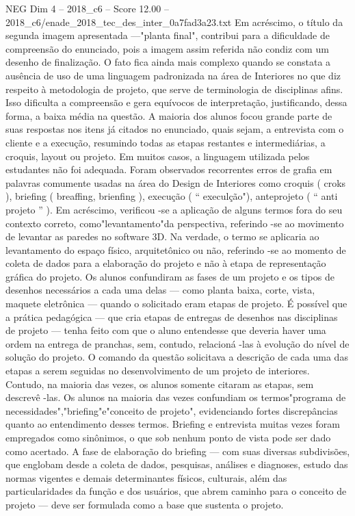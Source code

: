 \begin{textsample}{NEG Dim 4 – 2018\_c6 – Score 12.00 – 2018\_c6/enade\_2018\_tec\_des\_inter\_0a7fad3a23.txt}
Em acréscimo, o título da segunda imagem apresentada —"planta final", contribui para a dificuldade de compreensão do enunciado, pois a imagem assim referida não condiz com um desenho de finalização.
O fato fica ainda mais complexo quando se constata a ausência de uso de uma linguagem padronizada na área de Interiores no que diz respeito à metodologia de projeto, que serve de terminologia de disciplinas afins.
Isso dificulta a compreensão e gera equívocos de interpretação, justificando, dessa forma, a baixa média na questão.
A maioria dos alunos focou grande parte de suas respostas nos itens já citados no enunciado, quais sejam, a entrevista com o cliente e a execução, resumindo todas as etapas restantes e intermediárias, a croquis, layout ou projeto.
Em muitos casos, a linguagem utilizada pelos estudantes não foi adequada.
Foram observados recorrentes erros de grafia em palavras comumente usadas na área do Design de Interiores como croquis ( croks ), briefing ( breaffing, brienfing ), execução ( “ execulção"), anteprojeto ( “ anti projeto ” ).
Em acréscimo, verificou -se a aplicação de alguns termos fora do seu contexto correto, como"levantamento"da perspectiva, referindo -se ao movimento de levantar as paredes no software 3D.
Na verdade, o termo se aplicaria ao levantamento do espaço físico, arquitetônico ou não, referindo -se ao momento de coleta de dados para a elaboração do projeto e não à etapa de representação gráfica do projeto.
Os alunos confundiram as fases de um projeto e os tipos de desenhos necessários a cada uma delas — como planta baixa, corte, vista, maquete eletrônica — quando o solicitado eram etapas de projeto.
É possível que a prática pedagógica — que cria etapas de entregas de desenhos nas disciplinas de projeto — tenha feito com que o aluno entendesse que deveria haver uma ordem na entrega de pranchas, sem, contudo, relacioná -las à evolução do nível de solução do projeto.
O comando da questão solicitava a descrição de cada uma das etapas a serem seguidas no desenvolvimento de um projeto de interiores.
Contudo, na maioria das vezes, os alunos somente citaram as etapas, sem descrevê -las.
Os alunos na maioria das vezes confundiam os termos"programa de necessidades","briefing"e"conceito de projeto", evidenciando fortes discrepâncias quanto ao entendimento desses termos.
Briefing e entrevista muitas vezes foram empregados como sinônimos, o que sob nenhum ponto de vista pode ser dado como acertado.
A fase de elaboração do briefing — com suas diversas subdivisões, que englobam desde a coleta de dados, pesquisas, análises e diagnoses, estudo das normas vigentes e demais determinantes físicos, culturais, além das particularidades da função e dos usuários, que abrem caminho para o conceito de projeto — deve ser formulada como a base que sustenta o projeto.

\end{textsample}
